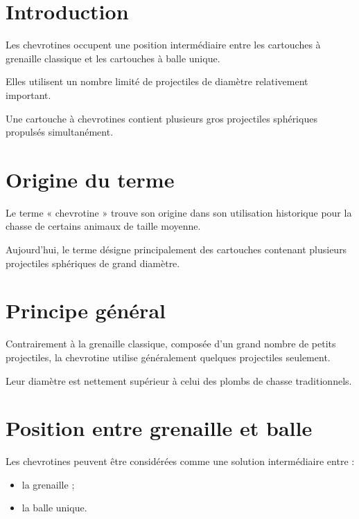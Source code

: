 
\section{Introduction}

Les chevrotines occupent une position intermédiaire entre les cartouches à
grenaille classique et les cartouches à balle unique.

Elles utilisent un nombre limité de projectiles de diamètre relativement
important.

\begin{aretenir}

Une cartouche à chevrotines contient plusieurs gros projectiles sphériques
propulsés simultanément.

\end{aretenir}

\section{Origine du terme}

Le terme « chevrotine » trouve son origine dans son utilisation historique pour
la chasse de certains animaux de taille moyenne.

Aujourd'hui, le terme désigne principalement des cartouches contenant plusieurs
projectiles sphériques de grand diamètre.

\section{Principe général}

Contrairement à la grenaille classique, composée d'un grand nombre de petits
projectiles, la chevrotine utilise généralement quelques projectiles seulement.

Leur diamètre est nettement supérieur à celui des plombs de chasse
traditionnels.

\section{Position entre grenaille et balle}

Les chevrotines peuvent être considérées comme une solution intermédiaire entre :

\begin{itemize}
    \item la grenaille ;
    \item la balle unique.
\end{itemize}

